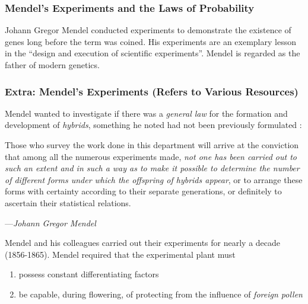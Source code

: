 \documentclass[12pt]{article}
\begin{document}
\subsubsection{Mendel's Experiments and the Laws of Probability}
Johann Gregor Mendel conducted experiments to demonstrate the existence of genes long before the term was coined. His experiments are an exemplary lesson in the ``design and execution of scientific experiments''. Mendel is regarded as the father of modern genetics.

\subsubsection{Extra: Mendel's Experiments (Refers to Various Resources)}
Mendel wanted to investigate if there was a \emph{general law} for the formation and development of \emph{hybrids}, something he noted had not been previously formulated \cite{mendel-fisher}: 
\epigraph{
    Those who survey the work done in this department will arrive at the conviction that among all the numerous experiments made, \emph{not one has been carried out to such an extent and in such a way as to make it possible to determine the number of different forms under which the offspring of hybrids appear}, or to arrange these forms with certainty according to their separate generations, or definitely to ascertain their statistical relations.
}
{
    ---\textit{Johann Gregor Mendel \cite{mendel-fisher}}
}

Mendel and his colleagues carried out their experiments for nearly a decade (1856-1865). Mendel required \cite{mendel-fisher} that the experimental plant must
\begin{enumerate}
    \item possess constant differentiating factors
    \item be capable, during flowering, of protecting from the influence of \emph{foreign pollen}
\end{enumerate}
\end{document}
